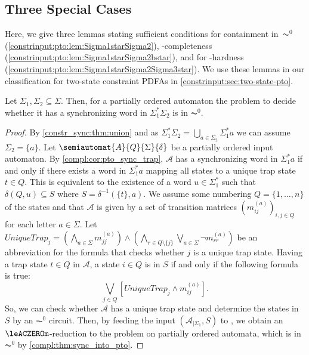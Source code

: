 \subsection{Three Special Cases} 
\label{constrinput:sec:pto:threecases}

Here, we give three lemmas stating sufficient
conditions for containment in~$\AC^0$ (\cref{constrinput:pto:lem:Sigma1starSigma2}),
\LOGSPACE-completeness (\cref{constrinput:pto:lem:Sigma1starSigma2bstar}),
and for \NP-hardness (\cref{constrinput:pto:lem:Sigma1starSigma2Sigma3star}).
We use these lemmas in our classification
for two-state constraint PDFAs in \cref{constrinput:sec:two-state-pto}. 

\begin{lemma}\label{constrinput:pto:lem:Sigma1starSigma2}
	Let $\Sigma_1, \Sigma_2 \subseteq \Sigma$. %
	Then, for a partially ordered automaton
	the problem to decide whether it has a synchronizing
	word in $\Sigma_1^* \Sigma_2$ is in $\AC^0$.	
\end{lemma}
\begin{proof}
	By \cref{constr_sync:thm:union} and as $\Sigma_1^* \Sigma_2 = \bigcup_{a \in \Sigma_2} \Sigma_1^*a$
	we can assume $\Sigma_2 = \{a\}$.
	Let $\semiautomat{A}{Q}{\Sigma}{\delta}$ be a partially ordered input automaton.	
	By \cref{compl:cor:pto_sync_trap},
	$\mathcal A$ has a synchronizing word in $\Sigma_1^*a$
	if and only if there exists a word in $\Sigma_1^*a$
	mapping all states to a unique trap state $t \in Q$. 
	This is equivalent to the existence of
	a word $u \in \Sigma_1^*$ such that $\delta(Q, u) \subseteq S$ where $S = \delta^{-1}(\{t\}, a)$.	
	We assume some numbering $Q = \{1,\ldots,n\}$ of the states
	and that $\mathcal A$
	is given by a set of transition matrices $(m^{(a)}_{ij})_{i,j \in Q}$
	for each letter $a \in \Sigma$.
	Let $UniqueTrap_j = \left( \bigwedge_{a \in \Sigma} m^{(a)}_{jj} \right)
	\land 
	\left( \bigwedge_{r \in Q \setminus \{j\}} \bigvee_{a \in \Sigma} \neg m_{rr}^{(a)} \right)$
	be an abbreviation for the formula that checks 
	whether $j$ is a unique trap state.
	Having a trap state $t \in Q$ in $\mathcal A$,
	a state $i \in Q$ is in $S$ if and only if the following formula is true:	
	\[
	\bigvee_{j \in Q} \left[ UniqueTrap_j \land m^{(a)}_{ij} \right].
	\]
	So, we can check whether $\mathcal A$ has a unique trap state and
	determine the states in~$S$ by an $\AC^0$ circuit. Then,
	by feeding the input $(\mathcal A_{|\Sigma_1}, S)$
	to \SIS, we obtain an $\leACZEROm$-reduction
	to the problem \SIS on partially ordered automata,
	which is in $\AC^0$ by \cref{compl:thm:sync_into_pto}.
\end{proof}

